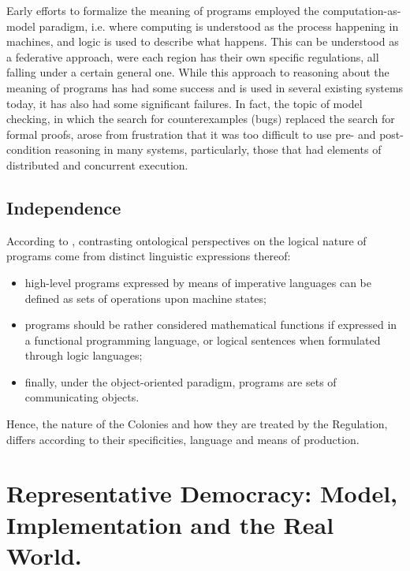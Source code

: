\documentclass[]{article}
\begin{document}
Early efforts to formalize the meaning of programs employed the
computation-as-model paradigm, i.e. where computing is understood as the process happening in machines, and logic is used to describe what happens. This can be understood as a federative approach, were each region has their own specific regulations, all falling under a certain general one.
While this approach to reasoning about the meaning of programs has had
some success and is used in several existing systems today, it has
also had some significant failures. In fact, the topic of model
checking, in which the search for counterexamples (bugs) replaced the
search for formal proofs, arose from frustration that it was too
difficult to use pre- and post-condition reasoning in many systems,
particularly, those that had elements of distributed and concurrent execution.






\subsection{Independence}



{\color{red}{this passage is inspired by Nicola's note}}

According to \cite{turner2018}, contrasting ontological perspectives on the logical nature of programs come from distinct linguistic expressions thereof:

\begin{itemize}
	\item  high-level programs expressed by means of imperative languages can be defined as sets of operations upon machine states;
	\item  programs should be rather considered mathematical functions if expressed in a functional programming language, or logical sentences when formulated
	through logic languages;
	\item finally, under the object-oriented paradigm, programs are sets of
	communicating objects.
\end{itemize}
%
Hence, the nature of the Colonies and how they are treated by the Regulation, differs according to their specificities, language and means of production.





\section{Representative Democracy: Model, Implementation and the Real World.}
\end{document}
